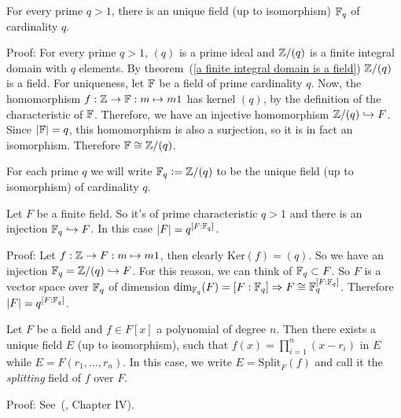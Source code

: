\begin{dang}
    \begin{theorem}
    For every prime $q>1$, there is an unique field (up to isomorphism) $\mathbb{F}_q$ of cardinality $q$.
    \end{theorem}
\end{dang}
Proof: For every prime $q>1$, $(q)$ is a prime ideal and $\mathbb{Z}/(q)$ is a finite integral domain with $q$ elements. By theorem~(\ref{a finite integral domain is a field}) $\mathbb{Z}/(q)$ is a field. For uniqueness, let $\mathbb{F}$ be a field of prime cardinality $q$. Now, the homomorphism $f:\mathbb{Z}\rightarrow \mathbb{F}:m\mapsto m1$ has kernel $(q)$, by the definition of the characteristic of $\mathbb{F}$. Therefore, we have an injective homomorphism $\mathbb{Z}/(q)\hookrightarrow F$. Since $|\mathbb{F}|=q$, this homomorphism is also a surjection, so it is in fact an isomorphism. Therefore $\mathbb{F}\cong \mathbb{Z}/(q)$.
\begin{dang}
    \begin{notation}
        For each prime $q$ we will write $\fq\bydef \bb{Z}/(q)$ to be the unique field (up to isomorphism) of cardinality $q$.
    \end{notation}
\end{dang}
\begin{dang}
    \begin{theorem}\cite{lidl1994introduction}\label{If F has characteristic q, then Fq is contained in F}
        Let $F$ be a finite field. So it's of prime characteristic $q>1$ and there is an injection $\mathbb{F}_q\hookrightarrow F$. In this case $|F|=q^{[F:\mathbb{F}_q]}$.
    \end{theorem}
\end{dang}
Proof: Let $f:\mathbb{Z}\rightarrow F: m\mapsto m1$, then clearly $\text{Ker}(f)=(q)$. So we have an injection $\mathbb{F}_q=\mathbb{Z}/(q)\hookrightarrow F$. For this reason, we can think of $\mathbb{F}_q\subset F$. So $F$ is a vector space over $\mathbb{F}_q$ of dimension $\text{dim}_{\mathbb{F}_q}(F)=[F:\mathbb{F}_q]\Rightarrow F\cong \mathbb{F}_q^{[F:\mathbb{F}_q]}$. Therefore $|F|=q^{[F:\mathbb{F}_q]}$.

\begin{dang}
    \begin{theorem}
        Let $F$ be a field and $f\in F[x]$ a polynomial of degree $n$. Then there exists a unique field $E$ (up to isomorphism), such that $f(x)=\prod_{i=1}^{n}(x-r_i)$ in $E$ while $E=F(r_1,\dots,r_n)$. In this case, we write $E=\text{Split}_F(f)$ and call it the \textit{splitting} field of $f$ over $F$.
    \end{theorem}
\end{dang}
Proof: See~(\cite{jacobson2012basic}, Chapter IV).

